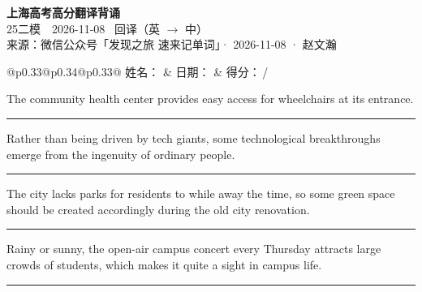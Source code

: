 \documentclass[11pt,a4paper]{article}
\newcommand{\num}[1]{\makebox[1.9em][r]{#1.}\hspace{0.3em}}
\newcommand{\wline}{\noindent\rule{\linewidth}{0.4pt}}
\begin{document}
\pagestyle{plain}
\begin{center}
{\LARGE\bfseries 上海高考高分翻译背诵 }\\[0.25em]
{\large 25二模　2026-11-08 \quad\ 回译（英 $\to$ 中）}\\[0.35em]
{\footnotesize 来源：微信公众号「发现之旅 速来记单词」· 2026-11-08 · 赵文瀚}
\end{center}

\vspace{0.4em}
\noindent\begin{tabular}{@{}p{0.33\textwidth}@{}p{0.34\textwidth}@{}p{0.33\textwidth}@{}}
姓名：\underline{\hspace{2.0cm}} & 日期：\underline{\hspace{2.0cm}} & 得分：\underline{\hspace{1.4cm}}\,/ \\
\end{tabular}

\vspace{0.5em}

\vspace{0.8em}
\num{1}The community health center provides easy access for wheelchairs at its entrance.

\vspace{0.25em}

\wline

\num{2}Rather than being driven by tech giants, some technological breakthroughs emerge from the ingenuity of ordinary people.

\vspace{0.25em}

\wline

\num{3}The city lacks parks for residents to while away the time, so some green space should be created accordingly during the old city renovation.

\vspace{0.25em}

\wline

\num{4}Rainy or sunny, the open-air campus concert every Thursday attracts large crowds of students, which makes it quite a sight in campus life.

\vspace{0.25em}

\wline
\end{document}
